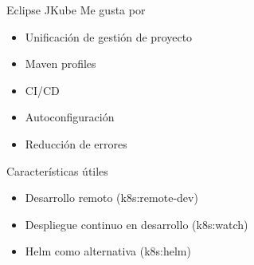 \documentclass[aspectratio=169]{beamer}
\begin{document}
\begin{frame}[fragile]{Eclipse JKube}
Me gusta por
\begin{itemize}
\item Unificación de gestión de proyecto
\item Maven profiles
\item CI/CD
\item Autoconfiguración
\item Reducción de errores
\end{itemize}

Características útiles
\begin{itemize}
\item Desarrollo remoto (k8s:remote-dev)
\item Despliegue continuo en desarrollo (k8s:watch)
\item Helm como alternativa (k8s:helm)
\end{itemize}
\end{frame}
\end{document}
